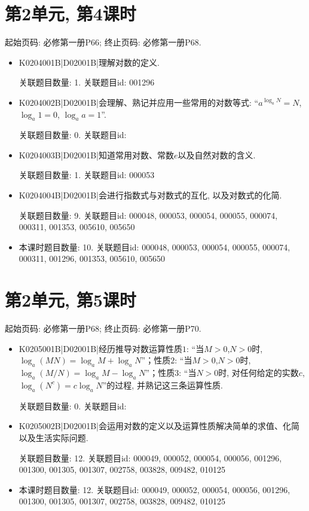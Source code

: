 \section*{第2单元, 第4课时}
起始页码: 必修第一册P66; 终止页码: 必修第一册P68.
\begin{itemize}
\item K0204001B|D02001B|理解对数的定义.

关联题目数量: 1. 关联题目id: 001296

\item K0204002B|D02001B|会理解、熟记并应用一些常用的对数等式: ``$a^{\log_aN}=N$, $\log_a1=0$, $\log_aa=1$''.

关联题目数量: 0. 关联题目id: 

\item K0204003B|D02001B|知道常用对数、常数$e$以及自然对数的含义.

关联题目数量: 1. 关联题目id: 000053

\item K0204004B|D02001B|会进行指数式与对数式的互化, 以及对数式的化简.

关联题目数量: 9. 关联题目id: 000048, 000053, 000054, 000055, 000074, 000311, 001353, 005610, 005650

\item 本课时题目数量: 10. 关联题目id: 000048, 000053, 000054, 000055, 000074, 000311, 001296, 001353, 005610, 005650

\end{itemize}

\section*{第2单元, 第5课时}
起始页码: 必修第一册P68; 终止页码: 必修第一册P70.
\begin{itemize}
\item K0205001B|D02001B|经历推导对数运算性质$1$: ``当$M>0$,$N>0$时, $\log_a(MN)=\log_aM+\log_aN$''；性质$2$: ``当$M>0$,$N>0$时, $\log_a(M/N)=\log_aM-\log_aN$''；性质$3$: ``当$N>0$时, 对任何给定的实数$c$, $\log_a(N^{c})=c\log_aN$''的过程, 并熟记这三条运算性质.

关联题目数量: 0. 关联题目id: 

\item K0205002B|D02001B|会运用对数的定义以及运算性质解决简单的求值、化简以及生活实际问题.

关联题目数量: 12. 关联题目id: 000049, 000052, 000054, 000056, 001296, 001300, 001305, 001307, 002758, 003828, 009482, 010125

\item 本课时题目数量: 12. 关联题目id: 000049, 000052, 000054, 000056, 001296, 001300, 001305, 001307, 002758, 003828, 009482, 010125

\end{itemize}


